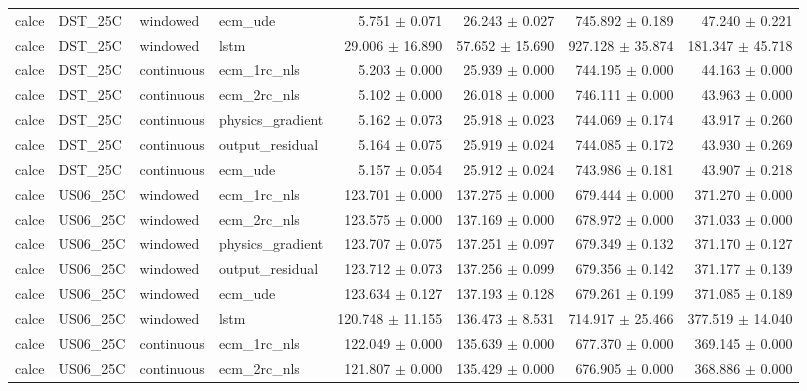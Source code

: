 \begin{longtable}{llllrrrr}
calce & DST\_25C & windowed & ecm\_ude & 5.751 $\pm$ 0.071 & 26.243 $\pm$ 0.027 & 745.892 $\pm$ 0.189 & 47.240 $\pm$ 0.221 \\
calce & DST\_25C & windowed & lstm & 29.006 $\pm$ 16.890 & 57.652 $\pm$ 15.690 & 927.128 $\pm$ 35.874 & 181.347 $\pm$ 45.718 \\
calce & DST\_25C & continuous & ecm\_1rc\_nls & 5.203 $\pm$ 0.000 & 25.939 $\pm$ 0.000 & 744.195 $\pm$ 0.000 & 44.163 $\pm$ 0.000 \\
calce & DST\_25C & continuous & ecm\_2rc\_nls & 5.102 $\pm$ 0.000 & 26.018 $\pm$ 0.000 & 746.111 $\pm$ 0.000 & 43.963 $\pm$ 0.000 \\
calce & DST\_25C & continuous & physics\_gradient & 5.162 $\pm$ 0.073 & 25.918 $\pm$ 0.023 & 744.069 $\pm$ 0.174 & 43.917 $\pm$ 0.260 \\
calce & DST\_25C & continuous & output\_residual & 5.164 $\pm$ 0.075 & 25.919 $\pm$ 0.024 & 744.085 $\pm$ 0.172 & 43.930 $\pm$ 0.269 \\
calce & DST\_25C & continuous & ecm\_ude & 5.157 $\pm$ 0.054 & 25.912 $\pm$ 0.024 & 743.986 $\pm$ 0.181 & 43.907 $\pm$ 0.218 \\
calce & US06\_25C & windowed & ecm\_1rc\_nls & 123.701 $\pm$ 0.000 & 137.275 $\pm$ 0.000 & 679.444 $\pm$ 0.000 & 371.270 $\pm$ 0.000 \\
calce & US06\_25C & windowed & ecm\_2rc\_nls & 123.575 $\pm$ 0.000 & 137.169 $\pm$ 0.000 & 678.972 $\pm$ 0.000 & 371.033 $\pm$ 0.000 \\
calce & US06\_25C & windowed & physics\_gradient & 123.707 $\pm$ 0.075 & 137.251 $\pm$ 0.097 & 679.349 $\pm$ 0.132 & 371.170 $\pm$ 0.127 \\
calce & US06\_25C & windowed & output\_residual & 123.712 $\pm$ 0.073 & 137.256 $\pm$ 0.099 & 679.356 $\pm$ 0.142 & 371.177 $\pm$ 0.139 \\
calce & US06\_25C & windowed & ecm\_ude & 123.634 $\pm$ 0.127 & 137.193 $\pm$ 0.128 & 679.261 $\pm$ 0.199 & 371.085 $\pm$ 0.189 \\
calce & US06\_25C & windowed & lstm & 120.748 $\pm$ 11.155 & 136.473 $\pm$ 8.531 & 714.917 $\pm$ 25.466 & 377.519 $\pm$ 14.040 \\
calce & US06\_25C & continuous & ecm\_1rc\_nls & 122.049 $\pm$ 0.000 & 135.639 $\pm$ 0.000 & 677.370 $\pm$ 0.000 & 369.145 $\pm$ 0.000 \\
calce & US06\_25C & continuous & ecm\_2rc\_nls & 121.807 $\pm$ 0.000 & 135.429 $\pm$ 0.000 & 676.905 $\pm$ 0.000 & 368.886 $\pm$ 0.000 \\

\end{longtable}
